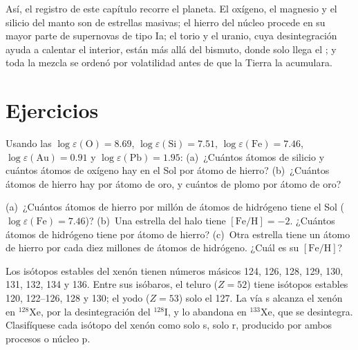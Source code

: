 Así, el registro de este capítulo recorre el planeta. El oxígeno, el
magnesio y el silicio del manto son  de estrellas masivas; el hierro del
núcleo procede en su mayor parte de supernovas de tipo Ia; el torio y el uranio, cuya
desintegración ayuda a calentar el interior, están más allá del bismuto, donde solo llega
el ; y toda la mezcla
se ordenó por volatilidad antes de que la Tierra la acumulara.

\section{Ejercicios}

\begin{exercise}[$\star$]\label{exo:b3:origin-of-elements:1}
Usando las  $\log\varepsilon(\mathrm{O}) = 8.69$,
$\log\varepsilon(\mathrm{Si}) = 7.51$, $\log\varepsilon(\mathrm{Fe}) =
7.46$, $\log\varepsilon(\mathrm{Au}) = 0.91$ y
$\log\varepsilon(\mathrm{Pb}) = 1.95$: (a)~¿Cuántos átomos de silicio y
cuántos átomos de oxígeno hay en el Sol por átomo de hierro? (b)~¿Cuántos
átomos de hierro hay por átomo de oro, y cuántos de plomo por átomo de oro?
\end{exercise}

\begin{exercise}[$\star$]\label{exo:b3:origin-of-elements:2}
(a)~¿Cuántos átomos de hierro por millón de átomos de hidrógeno tiene el Sol
($\log\varepsilon(\mathrm{Fe}) = 7.46$)? (b)~Una estrella del halo tiene
$[\mathrm{Fe/H}] = -2$. ¿Cuántos átomos de hidrógeno tiene por
átomo de hierro? (c)~Otra estrella tiene un átomo de hierro por cada diez millones
de átomos de hidrógeno. ¿Cuál es su $[\mathrm{Fe/H}]$?
\end{exercise}

\begin{exercise}[$\star$]\label{exo:b3:origin-of-elements:3}
Los isótopos estables del xenón tienen números másicos 124, 126, 128, 129, 130,
131, 132, 134 y 136. Entre sus isóbaros, el teluro ($Z = 52$) tiene
isótopos estables 120, 122--126, 128 y 130; el yodo ($Z = 53$) solo el 127.
La vía s alcanza el xenón en $^{128}\mathrm{Xe}$, por la desintegración del
$^{128}\mathrm{I}$, y lo abandona en $^{133}\mathrm{Xe}$, que se desintegra.
Clasifíquese cada isótopo del xenón como solo s, solo r, producido por ambos procesos o
núcleo p.
\end{exercise}

